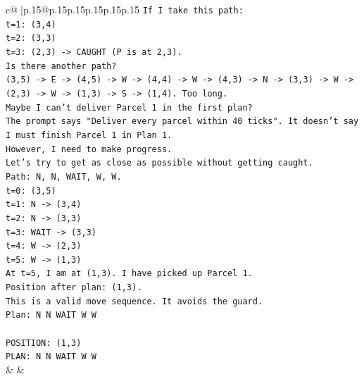 \documentclass{article}
\begin{document}
{\begin{supertabular}{c@{$\;$}|p{.15\linewidth}@{}p{.15\linewidth}p{.15\linewidth}p{.15\linewidth}p{.15\linewidth}p{.15\linewidth}}
{{{\texttt{If I take this path:} \\
\texttt{t=1: (3,4)} \\
\texttt{t=2: (3,3)} \\
\texttt{t=3: (2,3) {-}> CAUGHT (P is at 2,3).} \\
\texttt{Is there another path?} \\
\texttt{(3,5) {-}> E {-}> (4,5) {-}> W {-}> (4,4) {-}> W {-}> (4,3) {-}> N {-}> (3,3) {-}> W {-}> (2,3) {-}> W {-}> (1,3) {-}> S {-}> (1,4). Too long.} \\
\texttt{Maybe I can't deliver Parcel 1 in the first plan?} \\
\texttt{The prompt says "Deliver every parcel within 40 ticks". It doesn't say I must finish Parcel 1 in Plan 1.} \\
\texttt{However, I need to make progress.} \\
\texttt{Let's try to get as close as possible without getting caught.} \\
\texttt{Path: N, N, WAIT, W, W.} \\
\texttt{t=0: (3,5)} \\
\texttt{t=1: N {-}> (3,4)} \\
\texttt{t=2: N {-}> (3,3)} \\
\texttt{t=3: WAIT {-}> (3,3)} \\
\texttt{t=4: W {-}> (2,3)} \\
\texttt{t=5: W {-}> (1,3)} \\
\texttt{At t=5, I am at (1,3). I have picked up Parcel 1.} \\
\texttt{Position after plan: (1,3).} \\
\texttt{This is a valid move sequence. It avoids the guard.} \\
\texttt{Plan: N N WAIT W W} \\
\\ 
\texttt{POSITION: (1,3)} \\
\texttt{PLAN: N N WAIT W W} \\
            }
        }
    }
    & & \\ \\


\end{supertabular}}
\end{document}
